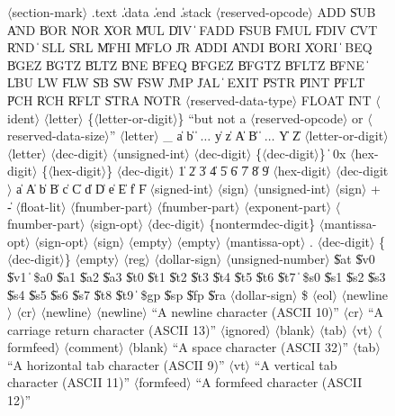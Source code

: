 \documentclass[11pt,letterpaper]{article}
\renewcommand{\nonterm}[1]{\mbox{$\langle$\textrm{#1}$\rangle$}}
\renewcommand{\arbno}[1]{\{#1\}}
\begin{document}
\begin{figure}
\begin{grammar}
\nonterm{section-mark} \: .text \| .data \| .end \| .stack
\nonterm{reserved-opcode} \: ADD \| SUB \| AND \| BOR \| NOR \| XOR \| MUL \| DIV
\> \| \> FADD \| FSUB \| FMUL \| FDIV \| CVT \| RND
\> \| \> SLL \| SRL \| MFHI \| MFLO \| JR \| ADDI \| ANDI \| BORI \| XORI
\> \| \> BEQ \| BGEZ \| BGTZ \| BLTZ \| BNE \| BFEQ \| BFGEZ \| BFGTZ \| BFLTZ \| BFNE
\> \| \> \| LBU \| LW \| FLW \| SB \| SW \| FSW \| JMP \| JAL
\> \| \> EXIT \| PSTR \| PINT \| PFLT \| PCH \| RCH \| RFLT \| STRA \| NOTR
\nonterm{reserved-data-type} \: FLOAT \| INT
\nonterm{ident} \: \nonterm{letter} \arbno{\nonterm{letter-or-digit}} \textrm{``but not a \nonterm{reserved-opcode} or \nonterm{reserved-data-size}''}
\nonterm{letter} \: \_ \| a \| b \| $\ldots$ \| y \| z \| A \| B \| $\ldots$ \| Y \| Z
\nonterm{letter-or-digit} \: \nonterm{letter} \| \nonterm{dec-digit}
\nonterm{unsigned-int} \: \nonterm{dec-digit} \arbno{\nonterm{dec-digit}}
 \> \| \> 0x \nonterm{hex-digit}  \arbno{\nonterm{hex-digit}}
\nonterm{dec-digit}  \| 1 \| 2 \| 3 \| 4 \| 5 \| 6 \| 7 \| 8 \| 9
\nonterm{hex-digit} \: \nonterm{dec-digit} \| a \| A \| b \| B \| c \| C \| d \| D \| e \| E \| f \| F
\nonterm{signed-int} \: \nonterm{sign} \nonterm{unsigned-int}
\nonterm{sign} \: + \| -
\nonterm{float-lit} \: \nonterm{fnumber-part} \| \nonterm{fnumber-part} \nonterm{exponent-part}
\nonterm{fnumber-part} \: \nonterm{sign-opt} \nonterm{dec-digit} \arbno{nonterm{dec-digit}} \nonterm{mantissa-opt}
\nonterm{sign-opt} \: \nonterm{sign} \| \nonterm{empty}
\nonterm{empty} \:
\nonterm{mantissa-opt} \: . \nonterm{dec-digit} \arbno{\nonterm{dec-digit}} \| \nonterm{empty}
\nonterm{reg} \: \nonterm{dollar-sign} \nonterm{unsigned-number} \| \$at \| \$v0 \| \$v1
\> \| \> \$a0 \| \$a1 \| \$a2 \| \$a3 \| \$t0 \| \$t1 \| \$t2 \| \$t3 \| \$t4 \| \$t5 \| \$t6 \| \$t7
\> \| \> \$s0 \| \$s1 \| \$s2 \| \$s3 \| \$s4 \| \$s5 \| \$s6 \| \$s7 \| \$t8 \| \$t9
\> \| \> \$gp \| \$sp \| \$fp \| \$ra
\nonterm{dollar-sign} \: \$
\nonterm{eol} \: \nonterm{newline} \| \nonterm{cr} \nonterm{newline}
\nonterm{newline} \: \textrm{``A newline character (ASCII 10)''}
\nonterm{cr} \: \textrm{``A carriage return character (ASCII 13)''}
\nonterm{ignored} \: \nonterm{blank} \| \nonterm{tab} \| \nonterm{vt} \| \nonterm{formfeed} \| \nonterm{comment}
\nonterm{blank} \: \textrm{``A space character (ASCII 32)''}
\nonterm{tab} \: \textrm{``A horizontal tab character (ASCII 9)''}
\nonterm{vt} \: \textrm{``A vertical tab character (ASCII 11)''}
\nonterm{formfeed} \: \textrm{``A formfeed character (ASCII 12)''}

\end{grammar}
\end{figure}
\end{document}

